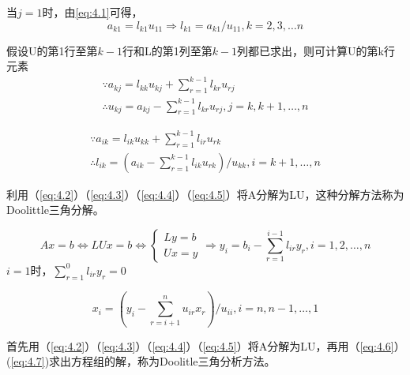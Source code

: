 \documentclass[a4paper]{article}
\begin{document}
当$j=1$时，由\ref{eq:4.1}可得，
\begin{equation}
  a_{k1}=l_{k1}u_{11}\Rightarrow l_{k1}=a_{k1}/u_{11}, k=2,3,\dots n 
  \label{eq:4.3}
\end{equation}

假设U的第1行至第$k-1$行和L的第1列至第$k-1$列都已求出，则可计算U的第k行元素
\begin{equation}
  \begin{array}{lr}
    \because a_{kj}=l_{kk}u_{kj} + \sum^{k-1}_{r=1}l_{kr}u_{rj} \\
    \therefore u_{kj}=a_{kj} - \sum^{k-1}_{r=1}l_{kr}u_{rj}, j=k,k+1,\dots, n
  \end{array}
  \label{eq:4.4}
\end{equation}

\begin{equation}
  \begin{array}{lr}
    \because a_{ik} = l_{ik}u_{kk} + \sum^{k-1}_{r=1}l_{ir}u_{rk} \\
    \therefore l_{ik} = (a_{ik}-\sum^{k-1}_{r=1}l_{ik}u_{rk})/u_{kk}, i=k+1, \dots, n
  \end{array}
  \label{eq:4.5}
\end{equation}

利用（\ref{eq:4.2}）（\ref{eq:4.3}）（\ref{eq:4.4}）（\ref{eq:4.5}）将A分解为LU，这种分解方法称为Doolittle三角分解。

\begin{equation}
  Ax=b \Leftrightarrow LUx = b \Leftrightarrow \left\{
    \begin{array}{lr}
      Ly = b \\
      Ux = y 
    \end{array}
    \right. \Rightarrow y_i=b_i-\sum^{i-1}_{r=1}l_{ir}y_r, i=1,2,\dots, n
    \label{eq:4.6}
\end{equation}
$i=1$时，$\sum^0_{r=1}l_{ir}y_r=0$

\begin{equation}
  x_i = (y_i-\sum^n_{r=i+1}u_{ir}x_r)/u_{ii}, i=n,n-1,\dots,1
  \label{eq:4.7}
\end{equation}

首先用（\ref{eq:4.2}）（\ref{eq:4.3}）（\ref{eq:4.4}）（\ref{eq:4.5}）将A分解为LU，再用（\ref{eq:4.6}）(\ref{eq:4.7})求出方程组的解，称为Doolitle三角分析方法。
\end{document}
